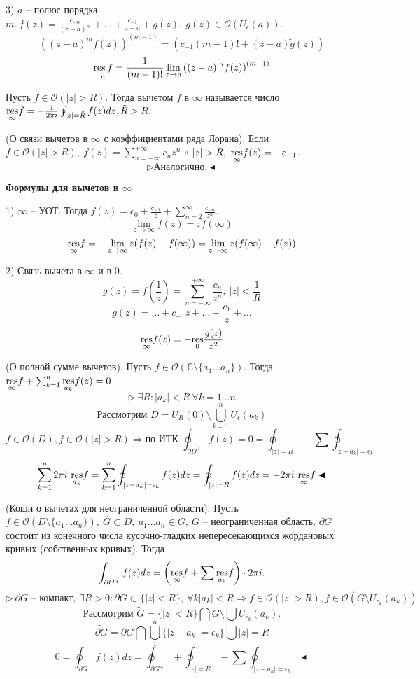 3) $a$ -- полюс порядка $m. \ f(z) = \frac{c_{-m}}{(z-a)^m} + \ldots + \frac{c_{-1}}{z-a} + g(z), \ g(z) \in \mathcal{O}(U_\epsilon(a))$.
\[\left((z-a)^m f(z)\right)^{(m-1)} = (c_{-1}(m-1)! + (z-a)\tilde{g}(z))\]
\[\underset{a}{\operatorname{res} f} = \frac{1}{(m-1)!}\lim_{z\to a} \left((z-a)^m f(z)\right)^{(m-1)}\]

 Пусть $f \in \mathcal{O}(|z| > R).$ Тогда вычетом $f$ в $\infty$ называется число $\underset{\infty}{\operatorname{res}} f = -\frac{1}{2\pi i} \oint_{|z| = \tilde{R}} f(z) dz, \tilde{R} > R.$

 (О связи вычетов в $\infty$ с коэффициентами ряда Лорана). Если $f \in \mathcal{O}(|z| > R), \ f(z) = \sum_{n=-\infty}^{+\infty} c_n z^n$ в $|z| > R, \ \underset{\infty}{\operatorname{res}} f(z) = -c_{-1}$.
\[\triangleright \text{Аналогично.} \blacktriangleleft\]

\textbf{Формулы для вычетов в $\infty$}

1) $\infty$ -- УОТ. Тогда $f(z) = c_0 + \frac{c_{-1}}{z} + \sum_{n=2}^\infty \frac{c_{-n}}{z^n}.$
\[\lim_{z\to \infty}f(z) =: f(\infty)\]
\[\underset{\infty}{\operatorname{res}} f = -\lim_{z\to \infty} z(f(z) - f(\infty)) = \lim_{z\to \infty} z(f(\infty) - f(z))\]

2) Связь вычета в $\infty$ и в 0.
\[g(z) = f\left(\frac{1}{z}\right) = \sum_{n=-\infty}^{+\infty}\frac{c_n}{z^n}, \ |z| < \frac{1}{R}\]
\[g(z) = \ldots + c_{-1}z + \ldots + \frac{c_1}{z} + \ldots\]
\[\underset{\infty}{\operatorname{res}} f(z) = - \underset{0}{\operatorname{res}}\frac{g(z)}{z^2}\]

 (О полной сумме вычетов). Пусть $f \in \mathcal{O}(\mathbb{C} \setminus \{a_1\ldots a_n\})$. Тогда $\underset{\infty}{\operatorname{res}} f + \sum_{k=1}^n \underset{a_k}{\operatorname{res}} f(z) = 0$.
\[\triangleright \ \exists R : |a_k| < R \ \forall k=1\ldots n\]
\[\text{Рассмотрим } D = U_R(0) \setminus \bigcup_{k=1}^n U_\epsilon(a_k)\]
\[f \in \mathcal{O}(D), f \in \mathcal{O}(|z|> R) \Rightarrow \text{по ИТК } \oint_{\partial D^+} f(z)= 0 = \oint_{|z|=R} - \sum \oint_{|z-a_k|=\epsilon_k}\]
\[\sum_{k=1}^n 2\pi i\ \underset{a_k}{\operatorname{res}}f = \sum_{k=1}^n \oint_{|z-a_k|=\epsilon_k} f(z) dz = \oint_{|z|=R} f(z) dz = -2\pi i \ \underset{\infty}{\operatorname{res}} f \blacktriangleleft\]

 (Коши о вычетах для неограниченной области). Пусть $f \in \mathcal{O}(D \setminus \{a_1\ldots a_n\}), \ \overline{G} \subset D, \ a_1\ldots a_n \in G, \ G$ -- неограниченная область, $\partial G$ состоит из конечного числа кусочно-гладких непересекающихся жордановых кривых (собственных кривых).
Тогда 
\[\int_{\partial G^+} f(z) dz = \left(\underset{\infty}{\operatorname{res}} f + \sum \underset{a_k}{\operatorname{res}}f\right) \cdot 2\pi i.\]
\[\triangleright \ \partial G \text{ -- компакт, } \exists R> 0: \partial G \subset \{|z|<R\}, \ \forall k |a_k|<R \Rightarrow f \in \mathcal{O}(|z| > R), f \in \mathcal{O}(G\setminus U_{\epsilon_k}(a_k))\]
\[\text{Рассмотрим } \tilde{G} = \{|z| < R\} \bigcap G \setminus \bigcup U_{\epsilon_k}(a_k).\]
\[\tilde{\partial G} = \partial G \bigcap \bigcup_{1}^n \{|z-a_k| = \epsilon_k\} \bigcup |z|=R\]
\[0 = \oint_{\tilde{\partial G}} f(z) dz = \oint_{\partial G^+} + \oint_{|z|=R} - \sum \oint_{|z-a_k|=\epsilon_k} \blacktriangleleft\]
